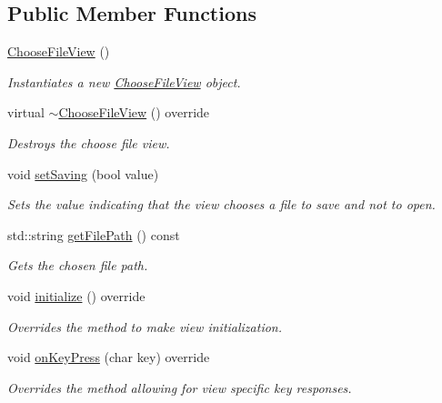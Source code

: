 \subsection*{Public Member Functions}
\begin{DoxyCompactItemize}
\item 
\mbox{\hyperlink{class_choose_file_view_a49d02999d2bff55a4d9716987a7f2e5f}{Choose\+File\+View}} ()
\begin{DoxyCompactList}\small\item\em Instantiates a new \mbox{\hyperlink{class_choose_file_view}{Choose\+File\+View}} object. \end{DoxyCompactList}\item 
virtual \mbox{\hyperlink{class_choose_file_view_aafd296eee3a027b1c71affb339dd66a4}{$\sim$\+Choose\+File\+View}} () override
\begin{DoxyCompactList}\small\item\em Destroys the choose file view. \end{DoxyCompactList}\item 
void \mbox{\hyperlink{class_choose_file_view_a029ba814f5f89c87f09dc23d61c936a6}{set\+Saving}} (bool value)
\begin{DoxyCompactList}\small\item\em Sets the value indicating that the view chooses a file to save and not to open. \end{DoxyCompactList}\item 
std\+::string \mbox{\hyperlink{class_choose_file_view_a13417add6f5b093f225fcb9aabe15545}{get\+File\+Path}} () const
\begin{DoxyCompactList}\small\item\em Gets the chosen file path. \end{DoxyCompactList}\item 
void \mbox{\hyperlink{class_choose_file_view_a16e0c6bdcb247f7b792934c4d7901db5}{initialize}} () override
\begin{DoxyCompactList}\small\item\em Overrides the method to make view initialization. \end{DoxyCompactList}\item 
void \mbox{\hyperlink{class_choose_file_view_a011a3bf65dfc4b5e02327760ab8370ea}{on\+Key\+Press}} (char key) override
\begin{DoxyCompactList}\small\item\em Overrides the method allowing for view specific key responses. \end{DoxyCompactList}\end{DoxyCompactItemize}
